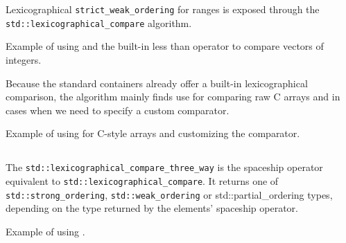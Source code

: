 Lexicographical \texttt{strict\_weak\_ordering} for ranges is exposed through the \texttt{std::lexicographical\_compare} algorithm.



\begin{box-note}
\footnotesize Example of using  and the built-in less than operator to compare vectors of integers.
\tcblower
{}
\end{box-note}

Because the standard containers already offer a built-in lexicographical comparison, the algorithm mainly finds use for comparing raw C arrays and in cases when we need to specify a custom comparator.

\begin{box-note}
\footnotesize Example of using  for C-style arrays and customizing the comparator.
\tcblower
{}
\end{box-note}

\subsection{\texorpdfstring{}{\texttt{std::lexicographical\_compare\_three\_way}}}

The \texttt{std::lexicographical\_compare\_three\_way} is the spaceship operator equivalent to \texttt{std::lexicographical\_compare}. It returns one of \texttt{std::strong\_ordering}, \texttt{std::weak\_ordering} or {std::partial\_ordering} types, depending on the type returned by the elements' spaceship operator.



\begin{box-note}
\footnotesize Example of using .
\tcblower
{}
\end{box-note}

